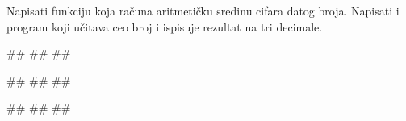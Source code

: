 \begin{Exercise}[label=p1.4_11] 
Napisati funkciju  koja
računa aritmetičku sredinu cifara datog broja. Napisati i program koji
učitava ceo broj i ispisuje rezultat na tri decimale.
 
\begin{miditest}
\begin{upotreba}{1}
#\naslovInt#
##
##
\end{upotreba}
\end{miditest}
\begin{miditest}
\begin{upotreba}{2}
#\naslovInt#
##
##
\end{upotreba}
\end{miditest}

\begin{miditest}
\begin{upotreba}{3}
#\naslovInt#
##
##
\end{upotreba}
\end{miditest}

\end{Exercise}
\ifresenja 
\begin{Answer}[ref=p1.4_11]
\end{Answer} 
\fi

